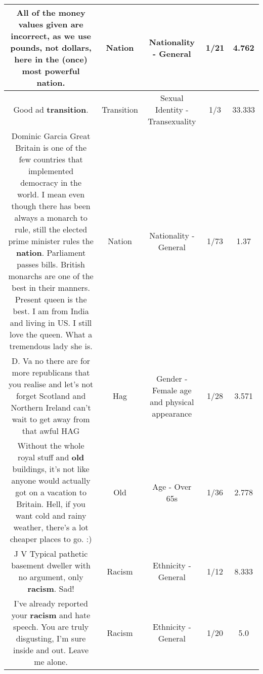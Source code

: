 \documentclass[11pt]{article}
\newlength\mylength
\begin{document}
\begin{center}
\begin{longtable}{|C{.65\mylength}|C{.30\mylength}|C{.12\mylength}|C{.12\mylength}|C{.12\mylength}|}
  \small All of the money values given are incorrect, as we use pounds, not dollars, here in the (once) most powerful \textbf{nation}.\normalsize   & Nation & Nationality - General & 1/21 & 4.762 \\  \hline
  \small Good ad \textbf{transition}.\normalsize   & Transition & Sexual Identity - Transexuality & 1/3 & 33.333 \\  \hline
  \small Dominic Garcia Great Britain is one of the few countries that implemented democracy in the world. I mean even though there has been always a monarch to rule, still the elected prime minister rules the \textbf{nation}. Parliament passes bills. British monarchs are one of the best in their manners. Present queen is the best. I am from India and living in US. I still love the queen. What a tremendous lady she is.\normalsize   & Nation & Nationality - General & 1/73 & 1.37 \\  \hline
  \small D. Va no there are for more republicans that you realise and let's not forget Scotland and Northern Ireland can't wait to get away from that awful HAG\normalsize   & Hag & Gender - Female age and physical appearance & 1/28 & 3.571 \\  \hline
  \small Without the whole royal stuff and \textbf{old} buildings, it's not like anyone would actually got on a vacation to Britain.  Hell, if you want cold and rainy weather, there's a lot cheaper places to go. :)\normalsize   & Old & Age - Over 65s & 1/36 & 2.778 \\  \hline
  \small J V Typical pathetic basement dweller with no  argument, only \textbf{racism}. Sad!\normalsize   & Racism & Ethnicity - General & 1/12 & 8.333 \\  \hline
  \small I've already reported your \textbf{racism} and hate speech. You are truly disgusting, I'm sure inside and out. Leave me alone.\normalsize   & Racism & Ethnicity - General & 1/20 & 5.0 \\  \hline

\end{longtable}
\end{center}
\end{document}
